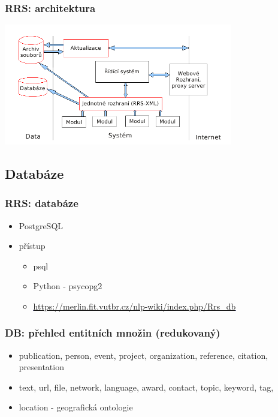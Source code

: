\documentclass{beamer}
\begin{document}
\begin{frame}
  \frametitle{RRS: architektura}
  \includegraphics[width=10cm]{rrs_arch.png}
\end{frame}

\subsection{Databáze}
\begin{frame}
  \frametitle{RRS: databáze}
  \begin{itemize}
    \item PostgreSQL
    \item přístup
      \begin{itemize}
        \item psql
        \item Python - psycopg2
        \item \textcolor{blue}{\underline{\href{https://merlin.fit.vutbr.cz/nlp-wiki/index.php/Rrs\_db}{https://merlin.fit.vutbr.cz/nlp-wiki/index.php/Rrs\_db}}}
      \end{itemize}
  \end{itemize}
\end{frame}

\begin{frame}
  \frametitle{DB: přehled entitních množin (redukovaný)}
  \begin{itemize}
    \item publication, person, event, project, organization, reference, citation, presentation
    \item text, url, file, network, language, award, contact, topic, keyword, tag, 
    \item location - geografická ontologie
  \end{itemize}
\end{frame}
\end{document}

